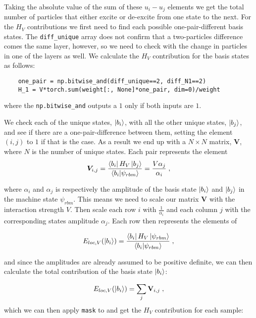 Taking the absolute value of the sum of these $u_i - u_j$ elements we get the total number of particles that either excite or de-excite from one state to the next. For the $H_V$ contributions we first need to find each possible one-pair-different basis states. The \texttt{diff_unique} array does not confirm that a two-particles difference comes the same layer, however, so we need to check with the change in particles in one of the layers as well. We calculate the $H_V$ contribution for the basis states as follows:

\begin{verbatim} 
    one_pair = np.bitwise_and(diff_unique==2, diff_N1==2)
    H_1 = V*torch.sum(weight[:, None]*one_pair, dim=0)/weight
\end{verbatim}

where the \texttt{np.bitwise_and} outputs a $1$ only if both inputs are $1$. 

We check each of the unique states, $\ket{b_i}$, with all the other unique states, $\ket{b_j}$, and see if there are a one-pair-difference between them, setting the element $\left (i, j \right )$ to $1$ if that is the case. As a result we end up with a $N\times N$ matrix, $\mathbf{V}$, where $N$ is the number of unique states. Each pair represents the element
\begin{equation}
  \boldsymbol{V}_{i,j} =\frac{\bra{b_i}H_V\ket{b_j}}{\braket{b_i}{\psi_{rbm}}} = \frac{V\alpha_j}{\alpha_i} \; ,
  \label{eq:LMG_imp_V_cont}
\end{equation}

where $\alpha_i$ and $\alpha_j$ is respectively the amplitude of the basis state $\ket{b_i}$ and $\ket{b_j}$ in the machine state $\psi_{rbm}$. This means we need to scale our matrix $\mathbf{V}$ with the interaction strength $V$. Then scale each row $i$ with $\frac{1}{\alpha_i}$ and each column $j$ with the corresponding states amplitude $\alpha_j$. Each row then represents the elements of 

$$ E_{loc, V}(\ket{b_i}) = \frac{\bra{b_i}H_V\ket{\psi_{rbm}}}{\braket{b_i}{\psi_{rbm}}} \; , $$

and since the amplitudes are already assumed to be positive definite, we can then calculate the total contribution of the basis state $\ket{b_i}$:

\begin{equation}
 E_{loc, V}(\ket{b_i})= \sum_j \mathbf{V}_{i,j} \; ,
\end{equation}
which we can then apply \texttt{mask} to and get the $H_V$ contribution for each sample:

